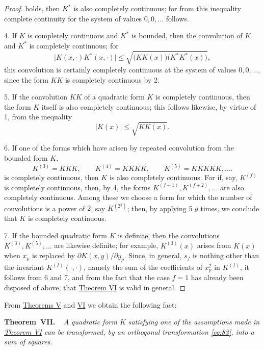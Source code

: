\documentclass[b5paper,twoside]{article}
\makeatletter
\newcommand{\hilbertstatementname}[2]{%
  \textbf{#1\if\relax\detokenize{#2}\relax\else\ #2\fi.}%
}
\newenvironment{theorem}[1][]{%
  \par\addvspace{.7\baselineskip}%
  \phantomsection
  \protected@edef\@currentlabel{#1}%
  \noindent\hilbertstatementname{Theorem}{#1}\ \itshape\ignorespaces
}{%
  \par\addvspace{.7\baselineskip}%
}
\newcommand{\originalpage}[1]{\phantomsection\label{origpage:#1}}
\makeatother
\begin{document}
\begin{proof}
\originalpage{205}
holds, then $K^*$ is also completely continuous; for from this inequality
complete continuity for the system of values $0,0,\ldots$ follows.

4. If $K$ is completely continuous and $K^*$ is bounded, then the
convolution of $K$ and $K^*$ is completely continuous; for
\[
  \lvert K(x,\mathord{\cdot})K^*(x,\mathord{\cdot})\rvert
  \leq \sqrt{\bigl(KK(x)\bigr)\bigl(K^*K^*(x)\bigr)},
\]
this convolution is certainly completely continuous at the system of values
$0,0,\ldots$, since the form $KK$ is completely continuous by 2.

5. If the convolution $KK$ of a quadratic form $K$ is completely
continuous, then the form $K$ itself is also completely continuous; this
follows likewise, by virtue of 1, from the inequality
\[
  \lvert K(x)\rvert\leq\sqrt{KK(x)}.
\]

6. If one of the forms which have arisen by repeated convolution from the
bounded form $K$,
\[
  K^{(3)}=KKK,\qquad K^{(4)}=KKKK,\qquad
  K^{(5)}=KKKKK,\ldots.
\]
is completely continuous, then $K$ is also completely continuous. For if,
say, $K^{(f)}$ is completely continuous, then, by 4, the forms
$K^{(f+1)},K^{(f+2)},\ldots$ are also completely continuous. Among these we
choose a form for which the number of convolutions is a power of $2$, say
$K^{(2^g)}$; then, by applying 5 $g$ times, we conclude that $K$ is
completely continuous.

7. If the bounded quadratic form $K$ is definite, then the convolutions
$K^{(3)},K^{(5)},\ldots$ are likewise definite; for example, $K^{(3)}(x)$
arises from $K(x)$ when $x_p$ is replaced by
$\partial K(x,y)/\partial y_p$. Since, in general, $s_f$ is nothing other than
the invariant $K^{(f)}(\mathord{\cdot},\mathord{\cdot})$, namely the sum
of the coefficients of $x_p^2$ in $K^{(f)}$, it follows from 6 and 7, and
from the fact that the case $f=1$ has already been disposed of above, that
\hyperref[thm:VI]{Theorem VI} is valid in general.
\end{proof}

From \hyperref[thm:V]{Theorems V} and \hyperref[thm:VI]{VI} we obtain the
following fact:

\begin{theorem}[VII]\label{thm:VII}
A quadratic form $K$ satisfying one of the assumptions made in
\hyperref[thm:VI]{Theorem VI} can be transformed, by an orthogonal
transformation \eqref{eq:83}, into a sum of squares.
\end{theorem}
\end{document}
